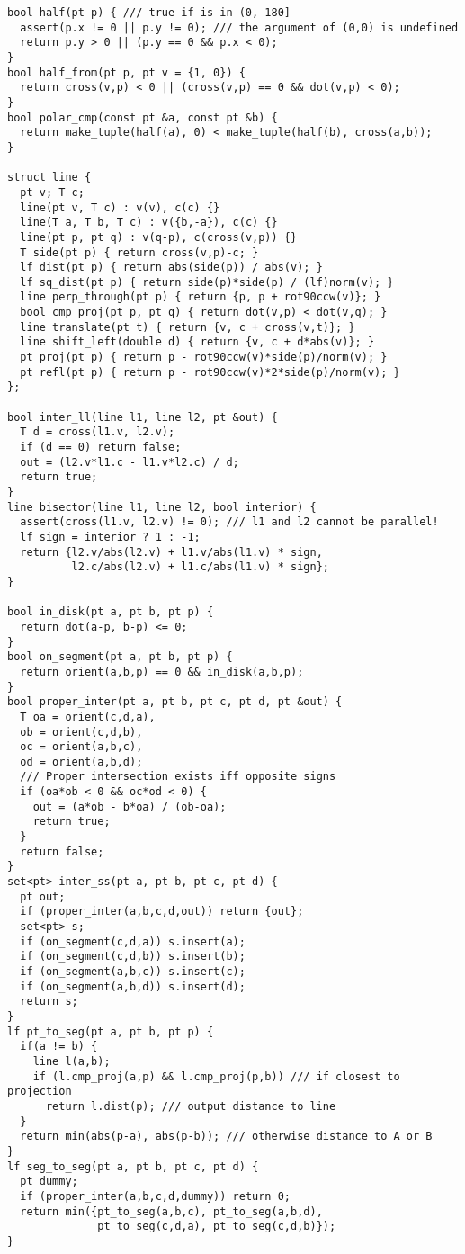 \documentclass[10pt,letterpaper,twocolumn,twosided]{article}
\begin{document}
\begin{lstlisting}
bool half(pt p) { /// true if is in (0, 180]
  assert(p.x != 0 || p.y != 0); /// the argument of (0,0) is undefined
  return p.y > 0 || (p.y == 0 && p.x < 0);
}
bool half_from(pt p, pt v = {1, 0}) {
  return cross(v,p) < 0 || (cross(v,p) == 0 && dot(v,p) < 0);
}
bool polar_cmp(const pt &a, const pt &b) {
  return make_tuple(half(a), 0) < make_tuple(half(b), cross(a,b));
}

struct line {
  pt v; T c;
  line(pt v, T c) : v(v), c(c) {}
  line(T a, T b, T c) : v({b,-a}), c(c) {}
  line(pt p, pt q) : v(q-p), c(cross(v,p)) {}
  T side(pt p) { return cross(v,p)-c; }
  lf dist(pt p) { return abs(side(p)) / abs(v); }
  lf sq_dist(pt p) { return side(p)*side(p) / (lf)norm(v); }
  line perp_through(pt p) { return {p, p + rot90ccw(v)}; }
  bool cmp_proj(pt p, pt q) { return dot(v,p) < dot(v,q); }
  line translate(pt t) { return {v, c + cross(v,t)}; }
  line shift_left(double d) { return {v, c + d*abs(v)}; }
  pt proj(pt p) { return p - rot90ccw(v)*side(p)/norm(v); }
  pt refl(pt p) { return p - rot90ccw(v)*2*side(p)/norm(v); }
};

bool inter_ll(line l1, line l2, pt &out) {
  T d = cross(l1.v, l2.v);
  if (d == 0) return false;
  out = (l2.v*l1.c - l1.v*l2.c) / d;
  return true;
}
line bisector(line l1, line l2, bool interior) {
  assert(cross(l1.v, l2.v) != 0); /// l1 and l2 cannot be parallel!
  lf sign = interior ? 1 : -1;
  return {l2.v/abs(l2.v) + l1.v/abs(l1.v) * sign,
          l2.c/abs(l2.v) + l1.c/abs(l1.v) * sign};
}

bool in_disk(pt a, pt b, pt p) {
  return dot(a-p, b-p) <= 0;
}
bool on_segment(pt a, pt b, pt p) {
  return orient(a,b,p) == 0 && in_disk(a,b,p);
}
bool proper_inter(pt a, pt b, pt c, pt d, pt &out) {
  T oa = orient(c,d,a),
  ob = orient(c,d,b),
  oc = orient(a,b,c),
  od = orient(a,b,d);
  /// Proper intersection exists iff opposite signs
  if (oa*ob < 0 && oc*od < 0) {
    out = (a*ob - b*oa) / (ob-oa);
    return true;
  }
  return false;
}
set<pt> inter_ss(pt a, pt b, pt c, pt d) {
  pt out;
  if (proper_inter(a,b,c,d,out)) return {out};
  set<pt> s;
  if (on_segment(c,d,a)) s.insert(a);
  if (on_segment(c,d,b)) s.insert(b);
  if (on_segment(a,b,c)) s.insert(c);
  if (on_segment(a,b,d)) s.insert(d);
  return s;
}
lf pt_to_seg(pt a, pt b, pt p) {
  if(a != b) {
    line l(a,b);
    if (l.cmp_proj(a,p) && l.cmp_proj(p,b)) /// if closest to  projection
      return l.dist(p); /// output distance to line
  }
  return min(abs(p-a), abs(p-b)); /// otherwise distance to A or B
}
lf seg_to_seg(pt a, pt b, pt c, pt d) {
  pt dummy;
  if (proper_inter(a,b,c,d,dummy)) return 0;
  return min({pt_to_seg(a,b,c), pt_to_seg(a,b,d),
              pt_to_seg(c,d,a), pt_to_seg(c,d,b)});
}


\end{lstlisting}
\end{document}
